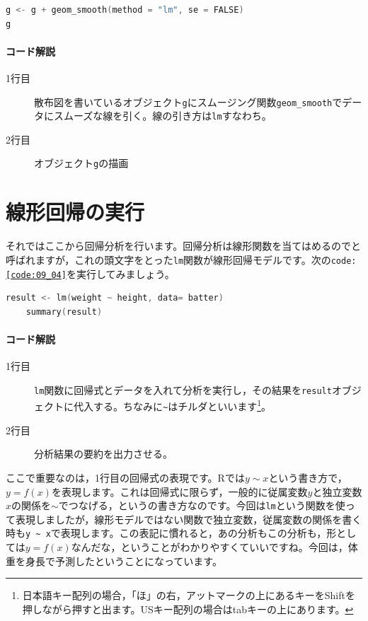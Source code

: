 \documentclass{ltjsbook}
\begin{document}
\begin{lstlisting}[language=c++,label={code:09_03},caption={回帰線を引く}]
g <- g + geom_smooth(method = "lm", se = FALSE)
g
\end{lstlisting}
\paragraph{コード解説}
\begin{description}
	\item[1行目] 散布図を書いているオブジェクト\texttt{g}にスムージング関数\verb|geom_smooth|でデータにスムーズな線を引く。線の引き方は\texttt{lm}すなわち。
	\item[2行目] オブジェクト\texttt{g}の描画
\end{description}

\section{線形回帰の実行}
それではここから回帰分析を行います。回帰分析は線形関数を当てはめるのでと呼ばれますが，これの頭文字をとった\texttt{lm}関数が線形回帰モデルです。次の\texttt{code:\ref{code:09_04}}を実行してみましょう。
\begin{lstlisting}[language=c++,label={code:09_04},caption={回帰分析の実行}]
    result <- lm(weight ~ height, data= batter)
    summary(result)
\end{lstlisting}

\paragraph{コード解説}
\begin{description}
	\item[1行目] \texttt{lm}関数に回帰式とデータを入れて分析を実行し，その結果を\texttt{result}オブジェクトに代入する。ちなみに\verb|~|はチルダといいます\footnote{日本語キー配列の場合，「ほ」の右，アットマークの上にあるキーをShiftを押しながら押すと出ます。USキー配列の場合はtabキーの上にあります。}。
	\item[2行目] 分析結果の要約を出力させる。
\end{description}

ここで重要なのは，1行目の回帰式の表現です。Rでは$y\sim x $という書き方で，$y=f(x)$を表現します。これは回帰式に限らず，一般的に従属変数$y$と独立変数$x$の関係を$\sim$でつなげる，というの書き方なのです。今回は\texttt{lm}という関数を使って表現しましたが，線形モデルではない関数で独立変数，従属変数の関係を書く時も\verb|y ~ x|で表現します。この表記に慣れると，あの分析もこの分析も，形としては$y=f(x)$なんだな，ということがわかりやすくていいですね。今回は，体重を身長で予測したということになっています。
\end{document}
